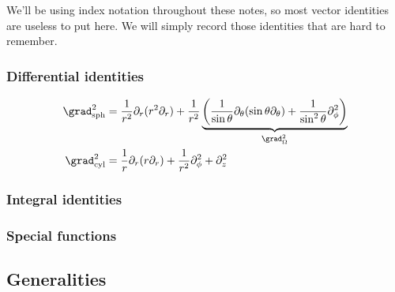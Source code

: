 \documentclass[11pt]{article}
\begin{document}
We'll be using index notation throughout these notes, so most vector identities
are useless to put here. We will simply record those identities that are hard to
remember.

\subsubsection{Differential identities}

\begin{align*}
    \grad^2_{\rm sph} & = \frac{1}{r^2} \partial_r (r^2 \partial_r) + \frac{1}{r^2} \underbrace{\left( \frac{1}{\sin \theta} \partial_\theta (\sin \theta \partial_\theta) + \frac{1}{\sin^2 \theta} \partial_\phi^2 \right)}_{\grad^2_{\Omega}}\\
    \grad^2_{\rm cyl} & = \frac{1}{r} \partial_r (r \partial_r) + \frac{1}{r^2} \partial_\phi^2 + \partial_z^2\\
\end{align*}

\subsubsection{Integral identities}

\subsubsection{Special functions}


\subsection{Generalities}
\end{document}
